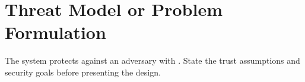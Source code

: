 \section{Threat Model or Problem Formulation}
The system protects  against an adversary with . State the trust assumptions and security goals before presenting the design.
